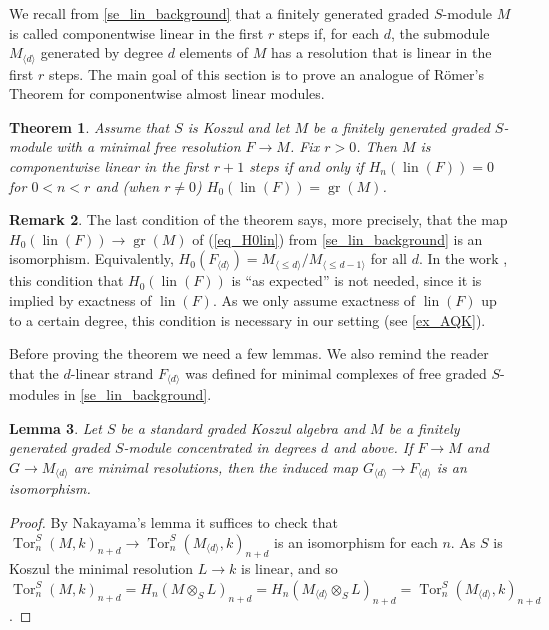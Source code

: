 \documentclass[a4paper,10pt]{amsart}
\newtheorem{theorem}{Theorem}[section]
\newtheorem{lemma}[theorem]{Lemma}
\theoremstyle{definition}
\newtheorem{remark}[theorem]{Remark}
\theoremstyle{remark}
\DeclareMathOperator{\gr}{gr}
\DeclareMathOperator{\lin}{lin}
\DeclareMathOperator{\Tor}{Tor}
\begin{document}
We recall from \cref{se_lin_background} that a finitely generated graded $S$-module $M$ is called {componentwise linear in the first $r$ steps} if, for each $d$, the submodule $M_{\langle d\rangle}$ generated by degree $d$ elements of $M$ has a resolution that is linear in the first $r$ steps. 
The main goal of this section is to prove an analogue of R\"omer's Theorem for componentwise almost linear modules.

\begin{theorem} \label{thm_complin_steps}
Assume that $S$ is Koszul and let $M$ be a finitely generated graded $S$-module with a minimal free resolution $F\to M$. Fix $r>0$. Then $M$ is componentwise linear in the first $r+1$ steps if and only if  $H_n(\lin(F))=0$ for $0<n< r$ and (when $r\neq 0$) $H_0(\lin(F))= \gr(M)$.
\end{theorem}

\begin{remark}
The last condition of the theorem says, more precisely, that the map $H_0(\lin(F))\to \gr(M)$ of (\ref{eq_H0lin}) from \cref{se_lin_background} is an isomorphism. Equivalently,  $H_0(F_{\langle d\rangle})=M_{\langle \leqslant d\rangle}/M_{\langle \leqslant d-1\rangle}$ for all $d$. In the work \cite{IR}, this condition that $H_0(\lin(F))$ is ``as expected'' is not needed, since it is implied by exactness of $\lin(F)$. As we only assume exactness of $\lin(F)$ up to a certain degree, this condition is necessary in our setting (see \cref{ex_AQK}).
\end{remark}

Before proving the theorem we need a few lemmas. We also remind the reader that the  $d$-linear strand $F_{\langle d\rangle}$ was defined for minimal complexes of free graded $S$-modules  in \cref{se_lin_background}.

\begin{lemma}\label{lem_lowest_strand}
    Let $S$ be a standard graded Koszul algebra and $M$ be a finitely generated graded $S$-module concentrated in degrees $d$ and above. If $F \to M$ and $G\to M_{\langle d\rangle}$ are minimal resolutions, then the induced map $G_{\langle d\rangle} \to  F_{\langle d\rangle}$ is an isomorphism.
\end{lemma}

\begin{proof} 
By Nakayama's lemma it suffices to check that $\Tor^S_n(M,k)_{n+d} \to \Tor^S_n(M_{\langle d\rangle},k)_{n+d}$ is an isomorphism for each $n$. As $S$ is Koszul the minimal resolution $L\to k$ is linear, and so $\Tor^S_n(M,k)_{n+d} = H_n(M\otimes_SL)_{n+d} = H_n(M_{\langle d\rangle}\otimes_SL)_{n+d} = \Tor^S_n(M_{\langle d\rangle},k)_{n+d}$.
\end{proof}
\end{document}
